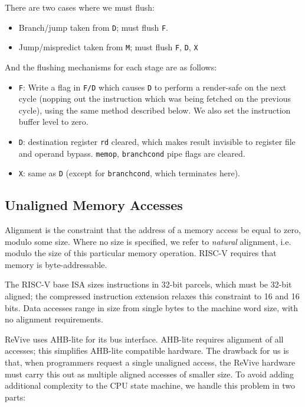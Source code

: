 \documentclass{article}
\begin{document}
There are two cases where we must flush:

\begin{itemize}
	\item Branch/jump taken from \texttt{D}; must flush \texttt{F}.
	\item Jump/mispredict taken from \texttt{M}; must flush \texttt{F}, \texttt{D}, \texttt{X}
\end{itemize}

And the flushing mechanisms for each stage are as follows:
\begin{itemize}
	\item \texttt{F}: Write a flag in \texttt{F/D} which causes \texttt{D} to perform a render-safe on the next cycle (nopping out the instruction which was being fetched on the previous cycle), using the same method described below. We also set the instruction buffer level to zero.
	\item \texttt{D}: destination register \texttt{rd} cleared, which makes result invisible to register file and operand bypass. \texttt{memop}, \texttt{branchcond} pipe flags are cleared.
	\item \texttt{X}: same as \texttt{D} (except for \texttt{branchcond}, which terminates here).
\end{itemize}

\subsection{Unaligned Memory Accesses}

Alignment is the constraint that the address of a memory access be equal to zero, modulo some size. Where no size is specified, we refer to \textit{natural} alignment, i.e. modulo the size of this particular memory operation. RISC-V requires that memory is byte-addressable.

The RISC-V base ISA sizes instructions in 32-bit parcels, which must be 32-bit aligned; the compressed instruction extension relaxes this constraint to 16 and 16 bits. Data accesses range in size from single bytes to the machine word size, with no alignment requirements.

ReVive uses AHB-lite for its bus interface. AHB-lite requires alignment of all accesses; this simplifies AHB-lite compatible hardware. The drawback for us is that, when programmers request a single unaligned access, the ReVive hardware must carry this out as multiple aligned accesses of smaller size. To avoid adding additional complexity to the CPU state machine, we handle this problem in two parts:
\end{document}
